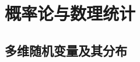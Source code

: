 \part{概率论与数理统计}
\begingroup
\def\x{\chi^2}%
\def\dotsim{\overset{.}{\sim}}%


\chapter{多维随机变量及其分布}








\endgroup
